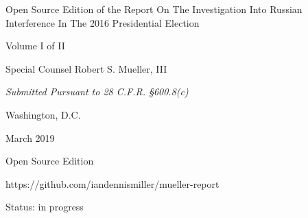 \thispagestyle{empty}

\begin{center}
\Huge
Open Source Edition of the
Report On The Investigation Into Russian Interference In The 2016 Presidential Election

\vspace{10 mm}

\large
Volume I of II

\vspace{10 mm}

Special Counsel Robert S. Mueller, III

\vspace{10 mm}

\normalsize

\textit{Submitted Pursuant to 28 C.F.R. \S 600.8(c)}

\vspace{20 mm}

Washington, D.C.

\vspace{10 mm}

March 2019

\vspace{10 mm}

\large
Open Source Edition

https://github.com/iandennismiller/mueller-report

Status: in progress

\end{center}

\newpage
